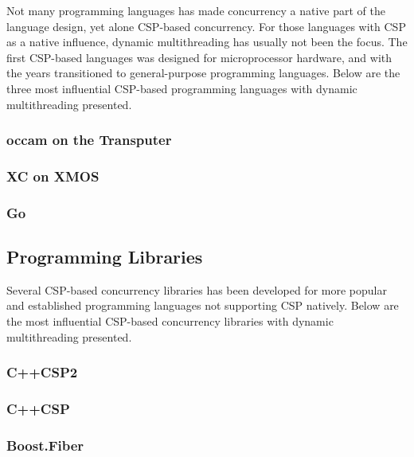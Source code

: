 Not many programming languages has made concurrency a native part of the language design, yet alone CSP\hyp{}based concurrency. For those languages with CSP as a native influence, dynamic multithreading has usually not been the focus. The first CSP\hyp{}based languages was designed for microprocessor hardware, and with the years transitioned to general\hyp{}purpose programming languages. Below are the three most influential CSP\hyp{}based programming languages with dynamic multithreading presented.


\subsubsection{occam on the Transputer}


\subsubsection{XC on XMOS}


\subsubsection{Go}


\subsection{Programming Libraries}


Several CSP\hyp{}based concurrency libraries has been developed for more popular and established programming languages not supporting CSP natively. Below are the most influential CSP\hyp{}based concurrency libraries with dynamic multithreading presented.


\subsubsection{C++CSP2}


\subsubsection{C++CSP}


\subsubsection{Boost.Fiber}


